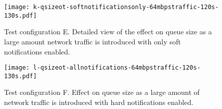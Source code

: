 \begin{figure}[h]
\centering
\texttt{[image: k-qsizeot-softnotificationsonly-64mbpstraffic-120s-130s.pdf]}
\caption{
    Test configuration E.
Detailed view of the effect on queue size as a large amount network traffic is introduced with only soft notifications enabled.
}
\label{fig:plotk}
\centering
\end{figure}

\begin{figure}
\centering
\texttt{[image: l-qsizeot-allnotifications-64mbpstraffic-120s-130s.pdf]}
\caption{Test configuration F. Effect on queue size as a large amount of network traffic is introduced with hard notifications enabled.}
\label{fig:plotl}
\end{figure}
